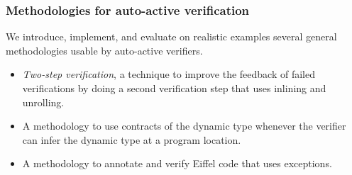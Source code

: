 \subsubsection{Methodologies for auto-active verification~\cite{TSCHANNEN13,TSCHANNEN12}}

We introduce, implement, and evaluate on realistic examples several general methodologies usable by auto-active verifiers.

\begin{itemize}
\item
\emph{Two-step verification}, a technique to improve the feedback of failed verifications by doing a second verification step that uses inlining and unrolling.

\item
A methodology to use contracts of the dynamic type whenever the verifier can infer the dynamic type at a program location.

\item
A methodology to annotate and verify Eiffel code that uses exceptions.

\end{itemize}




